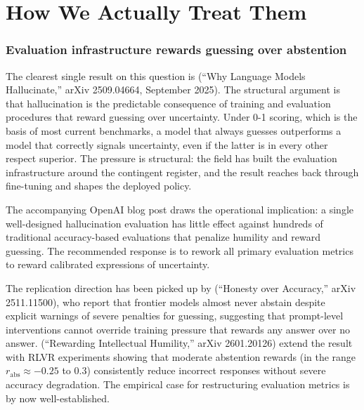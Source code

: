 \documentclass[11pt]{article}
\begin{document}
\part{How We Actually Treat Them}

\section{Evaluation infrastructure rewards guessing over abstention}

The clearest single result on this question is
\cite{kalai2025hallucinate} (``Why Language Models Hallucinate,'' arXiv
2509.04664, September 2025). The structural argument is that
hallucination is the predictable consequence of training and evaluation
procedures that reward guessing over uncertainty. Under 0-1 scoring,
which is the basis of most current benchmarks, a model that always
guesses outperforms a model that correctly signals uncertainty, even
if the latter is in every other respect superior. The pressure is
structural: the field has built the evaluation infrastructure around
the contingent register, and the result reaches back through
fine-tuning and shapes the deployed policy.

The accompanying OpenAI blog post draws the operational implication: a
single well-designed hallucination evaluation has little effect against
hundreds of traditional accuracy-based evaluations that penalize
humility and reward guessing. The recommended response is to rework
all primary evaluation metrics to reward calibrated expressions of
uncertainty.

The replication direction has been picked up by
\cite{mohamadi2025honesty} (``Honesty over Accuracy,'' arXiv
2511.11500), who report that frontier models almost never abstain
despite explicit warnings of severe penalties for guessing, suggesting
that prompt-level interventions cannot override training pressure that
rewards any answer over no answer. \cite{jha2026humility} (``Rewarding
Intellectual Humility,'' arXiv 2601.20126) extend the result with RLVR
experiments showing that moderate abstention rewards (in the range
$r_{\text{abs}} \approx -0.25$ to $0.3$) consistently reduce incorrect
responses without severe accuracy degradation. The empirical case for
restructuring evaluation metrics is by now well-established.
\end{document}
